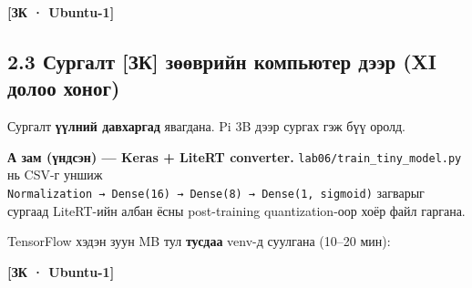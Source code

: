 \textbf{{[}ЗК · Ubuntu-1{]}}

\begin{Shaded}
\begin{Highlighting}[]
\end{Highlighting}
\end{Shaded}

\hypertarget{ux441ux443ux440ux433ux430ux43bux442-ux437ux43a-ux437ux4e9ux4e9ux432ux440ux438ux439ux43d-ux43aux43eux43cux43fux44cux44eux442ux435ux440-ux434ux44dux44dux440-xi-ux434ux43eux43bux43eux43e-ux445ux43eux43dux43eux433}{%
\subsection{2.3 Сургалт {[}ЗК{]} зөөврийн компьютер дээр (XI долоо хоног)}\label{ux441ux443ux440ux433ux430ux43bux442-ux437ux43a-ux437ux4e9ux4e9ux432ux440ux438ux439ux43d-ux43aux43eux43cux43fux44cux44eux442ux435ux440-ux434ux44dux44dux440-xi-ux434ux43eux43bux43eux43e-ux445ux43eux43dux43eux433}}

Сургалт \textbf{үүлний давхаргад} явагдана. Pi 3B дээр сургах гэж бүү оролд.

\textbf{А зам (үндсэн) --- Keras + LiteRT converter.} \texttt{lab06/\allowbreak{}train\_\allowbreak{}tiny\_\allowbreak{}model.\allowbreak{}py} нь CSV-г уншиж \texttt{Normalization\ →\ Dense(16)\ →\ Dense(8)\ →\ Dense(1,\ sigmoid)} загварыг сургаад LiteRT-ийн албан ёсны post-training quantization-оор хоёр файл гаргана.

TensorFlow хэдэн зуун MB тул \textbf{тусдаа} venv-д суулгана (10--20 мин):

\textbf{{[}ЗК · Ubuntu-1{]}}

\begin{Shaded}
\begin{Highlighting}[]
\end{Highlighting}
\end{Shaded}


